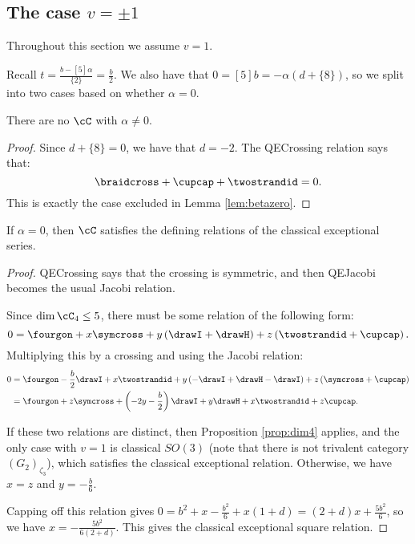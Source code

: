 \documentclass[12pt]{amsart}
\begin{document}
\subsection{The case \texorpdfstring{$v = \pm 1$}{v = pm 1}}

Throughout this section we assume $v=1$.

Recall $t = \frac{b-[5]\alpha}{\{2\}} = \frac{b}{2}$.  We also have that $0= [5]b = -\alpha (d+\{8\})$, so we split into two cases based on whether $\alpha = 0$.

\begin{lemma}
There are no $\cC$ with $\alpha \neq 0$.
\end{lemma}
\begin{proof}
Since $d+\{8\}=0$, we have that $d=-2$.  The QECrossing relation says that:
$$\braidcross + \cupcap + \twostrandid = 0.$$
This is exactly the case excluded in Lemma \ref{lem:betazero}.
\end{proof}

\begin{lemma}
If $\alpha = 0$, then $\cC$ satisfies the defining relations of the classical exceptional series.
\end{lemma}
\begin{proof}
QECrossing says that the crossing is symmetric, and then QEJacobi becomes the usual Jacobi relation. 

Since $\dim \cC_4 \leq 5$, there must be some relation of the following form:
$$0 = \fourgon + x \symcross + y \left(\drawI + \drawH \right) + z\left(\twostrandid + \cupcap \right).$$
Multiplying this by a crossing and using the Jacobi relation:
\begin{align*}
0 &= \fourgon - \frac{b}{2} \drawI + x \twostrandid + y \left(-\drawI + \drawH -\drawI \right) + z\left(\symcross + \cupcap \right) 
\\ &= \fourgon + z \symcross + \left(-2y -\frac{b}{2} \right) \drawI +y \drawH +x \twostrandid + z\cupcap. 
\end{align*}

If these two relations are distinct, then Proposition \ref{prop:dim4} applies, and the only case with $v=1$ is classical $SO(3)$ (note that there is not trivalent category $(G_2)_{\zeta_3}$), which satisfies the classical exceptional relation.  Otherwise, we have $x=z$ and $y = -\frac{b}{6}$.  

Capping off this relation gives $0 = b^2 + x -\frac{b^2}{6}+x(1+d) =  (2+d)x +\frac{5 b^2}{6}$, so we have $x = -\frac{5 b^2}{6(2+d)}$.  This gives the classical exceptional square relation.
\end{proof}
\end{document}
